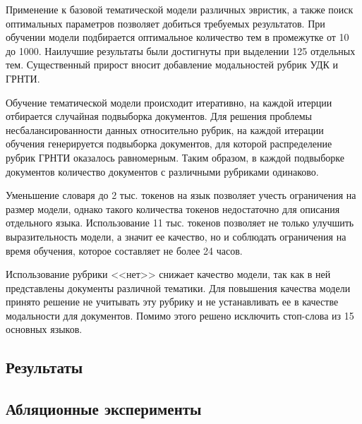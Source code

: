 \documentclass[12pt, twoside]{article}
\begin{document}
Применение к базовой тематической модели различных эвристик, а также поиск оптимальных параметров позволяет добиться требуемых результатов. При обучении модели подбирается оптимальное количество тем в промежутке от 10 до 1000. Наилучшие результаты были достигнуты при выделении 125 отдельных тем. Существенный прирост вносит добавление модальностей рубрик УДК и ГРНТИ. 

Обучение тематической модели происходит итеративно, на каждой итерции отбирается случайная подвыборка документов. Для решения проблемы несбалансированности данных относительно рубрик, на каждой итерации обучения генерируется подвыборка документов, для которой распределение рубрик ГРНТИ оказалось равномерным. Таким образом, в каждой подвыборке документов количество документов с различными рубриками одинаково.

Уменьшение словаря до 2 тыс. токенов на язык позволяет учесть ограничения на размер модели, однако такого количества токенов недостаточно для описания отдельного языка. Использование 11 тыс. токенов позволяет не только улучшить выразительность модели, а значит ее качество, но и соблюдать ограничения на время обучения, которое составляет не более 24 часов.

Использование рубрики <<нет>> снижает качество модели, так как в ней представлены документы различной тематики. Для повышения качества модели принято решение не учитывать эту рубрику и не устанавливать ее в качестве модальности для документов. Помимо этого решено исключить стоп-слова из 15 основных языков.

\subsection{Результаты}

\subsection{Абляционные эксперименты}
\end{document}
